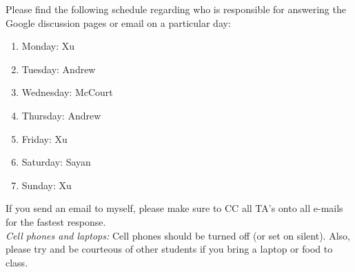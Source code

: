 \documentclass[11pt]{article}
\begin{document}
Please find the following schedule regarding who is responsible for answering the Google discussion pages or email on a particular day:

\begin{enumerate}
\item Monday: Xu
\item Tuesday: Andrew
\item Wednesday: McCourt 
\item Thursday: Andrew 
\item Friday: Xu
\item Saturday: Sayan
\item Sunday: Xu
\end{enumerate}

If you send an email to myself, please make sure to CC all TA's onto all e-mails for the fastest response.\\

%
%

\emph{Cell phones and laptops:} Cell phones should be turned off (or set on silent). Also, please try and be courteous of other students if you bring a laptop or food to class. \\
\end{document}
